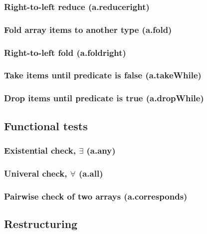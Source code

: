 \documentclass{article}
\theoremstyle{definition}
\begin{document}
\subsubsection{Right-to-left reduce (a.reduceright)}

\subsubsection{Fold array items to another type (a.fold)}

\subsubsection{Right-to-left fold (a.foldright)}

\subsubsection{Take items until predicate is false (a.takeWhile)}

\subsubsection{Drop items until predicate is true (a.dropWhile)}

\subsection{Functional tests}

\subsubsection{Existential check, $\exists$ (a.any)}

\subsubsection{Univeral check, $\forall$ (a.all)}

\subsubsection{Pairwise check of two arrays (a.corresponds)}

\subsection{Restructuring}
\end{document}
